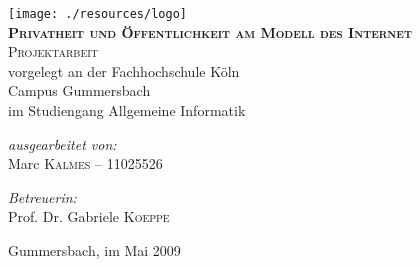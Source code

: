%
\begin{titlepage}
 
\begin{center}
 
 
\texttt{[image: ./resources/logo]}\\[1cm]
 
\textsc{\huge \bfseries Privatheit und Öffentlichkeit am Modell des Internet}\\[2.0cm]
 
\textsc{\Large Projektarbeit}\\[1.5cm]
\Large vorgelegt an der Fachhochschule Köln\\[0.2cm]
\Large Campus Gummersbach\\[0.2cm]
\Large im Studiengang Allgemeine Informatik\\[1.5cm]
 
 
 
 
\begin{minipage}{0.4\textwidth}
\begin{flushleft} \large
\emph{ausgearbeitet von:}\\
Marc \textsc{Kalmes} -- 11025526
\end{flushleft}
\end{minipage}
\begin{minipage}{0.4\textwidth}
\begin{flushright} \large
\emph{Betreuerin:}\\
Prof. Dr. Gabriele \textsc{Koeppe}
\end{flushright}
\end{minipage}
 
\vfill
 
{\large Gummersbach, im Mai 2009}
 
\end{center}
 
\end{titlepage}